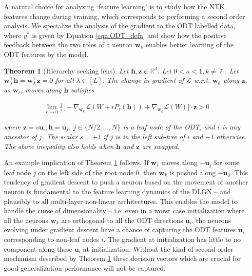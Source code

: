 \documentclass{article}
\theoremstyle{plain}
\newtheorem{theorem}{Theorem}[section]
\theoremstyle{definition}
\theoremstyle{remark}
\newcommand{\R}{{\mathbb R}}
\newcommand{\1}{{\mathbf 1}}
\newcommand{\0}{{\mathbf 0}}
\newcommand{\h}{{\mathbf h}}
\newcommand{\z}{{\mathbf z}}
\newcommand{\w}{{\mathbf w}}
\newcommand{\bu}{{\mathbf u}}
\renewcommand{\>}{{\rightarrow}}
\begin{document}
A natural choice for analyzing `feature learning' is to study how the NTK features change during training, which corresponds to performing a second order analysis.  We  specialize the analysis of the gradient to the ODT labelled data, where $y^*$ is given by Equation \ref{eqn:ODT_defn} and show how the positive feedback between the two roles of a neuron $\w_k$ enables better learning of the ODT features by the model. 


\begin{theorem}[Hierarchy seeking lens]
\label{thm:second_order_lens}
Let $\h, \z  \in \R^d$. Let $0<a<1, k\neq \ell$. Let $\w_\lambda^\top \h = \w_\lambda^\top \z = 0$ for all $\lambda \in [L]$. The change in gradient of $\mathcal{L}$ w.r.t. $\w_k$ along $\z$,   as $\w_\ell$, moves along $\h$ satisfies

\begin{align*}
\lim_{\epsilon \to 0} \frac{1}{\epsilon} \bigg[ 
 -\nabla_{\w_k} \mathcal{L}(W + \epsilon P_\ell(\h))  
 + \nabla_{\w_k} \mathcal{L}(W)  \bigg]\cdot \z > 0
\end{align*}

where $\z= s \bu_i, \h = \bu_j$,  $j\in\{N/2,\ldots,N\}$ is a leaf node of the ODT, and $i$ is any ancestor of $j$. The scalar $s=+1$ if $j$ is in the left sub-tree of $i$ and $-1$ otherwise. The above inequality also holds when $\h$ and $\z$ are swapped.
\end{theorem}


An example implication  of Theorem \ref{thm:second_order_lens} follows.  If $\w_\ell$ moves along $-\bu_j$ for some leaf node $j$ on the left side of the root node $0$, then $\w_k$ is pushed along $-\bu_0$. This tendency of gradient descent to push a neuron based on the movement of another neuron is fundamental to the feature learning dynamics of the DLGN -- and plausibly to all multi-layer non-linear architectures. This enables the model to handle the curse of dimensionality -- i.e. even in a worst case initialization where all the neurons $\w_k$ are orthogonal to all the ODT directions $\bu_i$, the neurons evolving under gradient descent have a chance of capturing the ODT features $\bu_i$ corresponding to non-leaf nodes $i$. The gradient at initialization has little to no component along these $\bu_i$ at initialization. Without the kind of second order mechanism described by Theorem \ref{thm:second_order_lens} these decision vectors which are crucial for good generalization performance will not be captured. 
\end{document}
